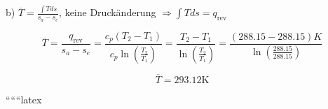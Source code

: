 b) \(\overline{T} = \frac{\int T ds}{s_a - s_e}\), keine Druckänderung \(\Rightarrow \int T ds = q_{\text{rev}}\)

\[
\overline{T} = \frac{q_{\text{rev}}}{s_a - s_e} = \frac{c_p (T_2 - T_1)}{c_p \ln \left( \frac{T_2}{T_1} \right)} = \frac{T_2 - T_1}{\ln \left( \frac{T_2}{T_1} \right)} = \frac{(288.15 - 288.15) K}{\ln \left( \frac{288.15}{288.15} \right)}
\]

\[
\overline{T} = 293.12 \text{K}
\]

``````latex
